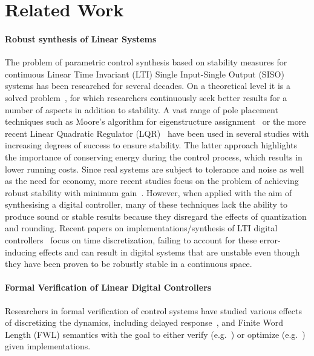 \documentclass[final]{sig-alternate-05-2015}
\begin{document}
\section{Related Work}\label{sec:related}

\paragraph{Robust synthesis of Linear Systems} 

The problem of parametric control synthesis based on stability measures for
continuous Linear Time Invariant (LTI) Single Input-Single Output (SISO)
systems has been researched for several decades.  On a theoretical level it
is a solved problem~\cite{wonham1967pole}, for which researchers
continuously seek better results for a number of aspects in addition to
stability.  A vast range of pole placement techniques such as Moore's
algorithm for eigenstructure assignment~\cite{klein1977eigenvalue} or the
more recent Linear Quadratic Regulator (LQR)~\cite{bemporad2002explicit}
have been used in several studies with increasing degrees of success to
ensure stability.  The latter approach highlights the importance of
conserving energy during the control process, which results in lower running
costs.  Since real systems are subject to tolerance and noise as well as the
need for economy, more recent studies focus on the problem of achieving
robust stability with minimum gain~\cite{schmid2014unified,
konigorski2012pole}.  However, when applied with the aim of synthesising a
digital controller, many of these techniques lack the ability to produce
sound or stable results because they disregard the effects of quantization
and rounding.  Recent papers on implementations/synthesis of LTI digital
controllers~\cite{das2013lqr, ghosh2013fpga} focus on time discretization,
failing to account for these error-inducing effects and can result in digital 
systems that are unstable even though they have been proven to be
robustly stable in a continuous space.  

\paragraph{Formal Verification of Linear Digital Controllers} 

Researchers in formal verification of control systems have studied various
effects of discretizing the dynamics, including delayed
response~\cite{Duggirala2015}, and Finite Word Length (FWL) semantics with
the goal to either verify (e.g.~\cite{daes20161}) or optimize
(e.g.~\cite{oudjida2014design}) given implementations.
\end{document}
